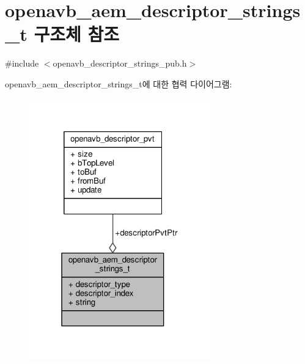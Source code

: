 \hypertarget{structopenavb__aem__descriptor__strings__t}{}\section{openavb\+\_\+aem\+\_\+descriptor\+\_\+strings\+\_\+t 구조체 참조}
\label{structopenavb__aem__descriptor__strings__t}


{\ttfamily \#include $<$openavb\+\_\+descriptor\+\_\+strings\+\_\+pub.\+h$>$}



openavb\+\_\+aem\+\_\+descriptor\+\_\+strings\+\_\+t에 대한 협력 다이어그램\+:
\nopagebreak
\begin{figure}[H]
\begin{center}
\leavevmode
\includegraphics[width=223pt]{structopenavb__aem__descriptor__strings__t__coll__graph}
\end{center}
\end{figure}

